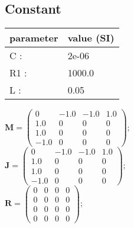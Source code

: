 \documentclass[11pt, oneside]{article}      %
\begin{document}
\subsection{Constant}
%
\begin{center}
%
\begin{tabular}{ll}
%
\hline
parameter & value (SI)
\\ \hline
C :& 2e-06
\\
R1 :& 1000.0
\\
L :& 0.05
\\
\hline
\end{tabular}
%
\end{center}
%
$ \mathbf{M} = \left(\begin{array}{cccc}0 & -1.0 & -1.0 & 1.0\\1.0 & 0 & 0 & 0\\1.0 & 0 & 0 & 0\\-1.0 & 0 & 0 & 0\end{array}\right) ; $ 
%
\\
%
$ \mathbf{J} = \left(\begin{array}{cccc}0 & -1.0 & -1.0 & 1.0\\1.0 & 0 & 0 & 0\\1.0 & 0 & 0 & 0\\-1.0 & 0 & 0 & 0\end{array}\right) ; $ 
%
\\
%
$ \mathbf{R} = \left(\begin{array}{cccc}0 & 0 & 0 & 0\\0 & 0 & 0 & 0\\0 & 0 & 0 & 0\\0 & 0 & 0 & 0\end{array}\right) ; $ 
%
\\
%
\end{document}
